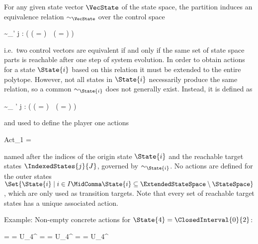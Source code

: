     For any given state vector $\VecState$ of the state space, the partition induces an equivalence relation $\sim_\VecState$ over the control space

    \startformula
        \VecControl \sim_\VecState \VecControl' \;\Longleftrightarrow\;
        \forall j \in \StateIndices: \Big(
            ( \Posterior{\VecState}{\VecControl} \cap {} = \emptyset ) \,\leftrightarrow\,
            (  \cap {} = \emptyset )
        \Big) \EndComma
    \stopformula

    i.e.\ two control vectors are equivalent if and only if the same set of state space parts is reachable after one step of system evolution.
    In order to obtain actions for a state $\State{i}$ based on this relation it must be extended to the entire polytope.
    However, not all states in $\State{i}$ necessarily produce the same relation, so a common $\sim_{\State{i}}$ does not generally exist.
    Instead, it is defined as

    \startformula
        \VecControl \sim_{} \VecControl' \;\Longleftrightarrow\;
        \forall j \in \StateIndices: \Big(
            (  \cap {} = \emptyset ) \,\leftrightarrow\,
            (  \cap {} = \emptyset )
        \Big)
    \stopformula

    and used to define the player one actions

    \startformula
        Act_1 =  \EndComma
    \stopformula

    named after the indices of the origin state $\State{i}$ and the reachable target states $\IndexedStates{j}{J}$, governed by $\sim_{\State{i}}$.
    No actions are defined for the outer states $\Set{ \State{i} \mid i \in I \MidComma \State{i} \subseteq \ExtendedStateSpace \setminus \StateSpace }$, which are only used as transition targets.
    Note that every set of reachable target states has a unique associated action.

    Example: %
    Non-empty concrete actions for $\State{4} = \ClosedInterval{0}{2}$:

    \startformula
        \startalign[n=3,align={left,left,left}]
            \NC {}
            \NC = 
            \NC = U_4^{} \EndComma
            \NR
            \NC {}
            \NC = 
            \NC = U_4^{} \EndComma
            \NR
            \NC {}
            \NC = 
            \NC = U_4^{} \EndPeriod
            \NR
        \stopalign
    \stopformula

